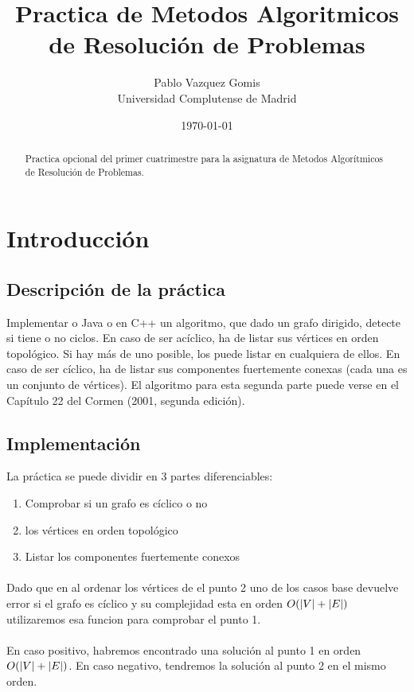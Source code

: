 \documentclass{article}
\title{Practica de Metodos Algoritmicos de Resolución de Problemas}
\author{Pablo Vazquez Gomis  \\
	Universidad Complutense de Madrid \\
	}
\date{\today}
\DeclarePairedDelimiter\abs{\lvert}{\rvert}%
\begin{document}
\maketitle


\begin{abstract}
Practica opcional del primer cuatrimestre para la asignatura de Metodos Algorítmicos de Resolución de Problemas.
\end{abstract}

\section{Introducción}
\subsection{Descripción de la práctica}
Implementar o Java o en C++ un algoritmo, que dado un grafo dirigido, detecte si tiene o no
ciclos. En caso de ser acíclico, ha de listar sus vértices en orden topológico. Si hay más de uno
posible, los puede listar en cualquiera de ellos. En caso de ser cíclico, ha de listar sus componentes
fuertemente conexas (cada una es un conjunto de vértices). El algoritmo para esta segunda parte
puede verse en el Capítulo 22 del Cormen (2001, segunda edición).

\subsection{Implementación}

La práctica se puede dividir en 3 partes diferenciables:
\begin{enumerate}
\item \label{1} Comprobar si un grafo es cíclico o no
\item \label{2} los vértices en orden topológico
\item Listar los componentes fuertemente conexos 
\end{enumerate}

\paragraph{}Dado que en al ordenar los vértices de el punto 2 uno de los casos base devuelve error si el
grafo es cíclico y su complejidad esta en orden $ O(\abs{V} + \abs{E}) $ utilizaremos esa funcion para comprobar el punto 1.

\paragraph{}En caso positivo, habremos encontrado una solución al punto 1 en orden $ O(\abs{V} + \abs{E}) $. En caso negativo, tendremos la solución al punto 2
en el mismo orden.
\end{document}
